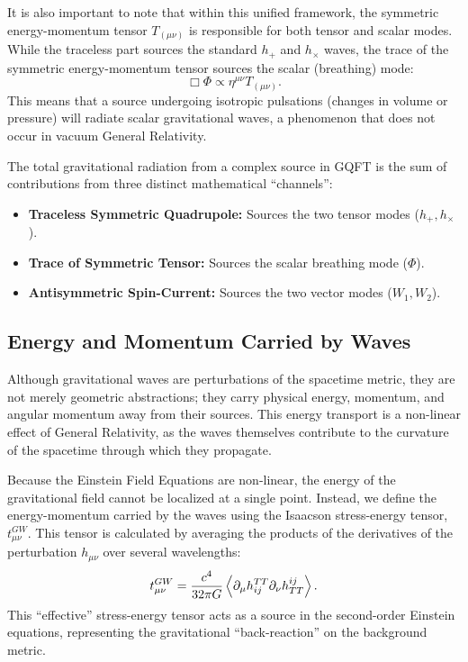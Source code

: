 It is also important to note that within this unified framework, the symmetric energy-momentum tensor $T_{(\mu\nu)}$ is responsible for both tensor and scalar modes. While the traceless part sources the standard $h_+$ and $h_\times$ waves, the trace of the symmetric energy-momentum tensor sources the scalar (breathing) mode:
\[%
  \Box \Phi \propto \eta^{\mu\nu} T_{(\mu\nu)}
.\]%
This means that a source undergoing isotropic pulsations (changes in volume or pressure) will radiate scalar gravitational waves, a phenomenon that does not occur in vacuum General Relativity.

The total gravitational radiation from a complex source in GQFT is the sum of contributions from three distinct mathematical ``channels'':
\begin{itemize}
  \item \textbf{Traceless Symmetric Quadrupole:} Sources the two tensor modes ($h_+, h_\times$).
  \item \textbf{Trace of Symmetric Tensor:} Sources the scalar breathing mode ($\Phi$).
  \item \textbf{Antisymmetric Spin-Current:} Sources the two vector modes ($W_1, W_2$).
\end{itemize}

\subsection{Energy and Momentum Carried by Waves} Although gravitational waves are perturbations of the spacetime metric, they are not merely geometric abstractions; they carry physical energy, momentum, and angular momentum away from their sources. This energy transport is a non-linear effect of General Relativity, as the waves themselves contribute to the curvature of the spacetime through which they propagate.

Because the Einstein Field Equations are non-linear, the energy of the gravitational field cannot be localized at a single point. Instead, we define the energy-momentum carried by the waves using the Isaacson stress-energy tensor, $t_{\mu\nu}^{GW}$. This tensor is calculated by averaging the products of the derivatives of the perturbation $h_{\mu\nu}$ over several wavelengths:
\[%
  t_{\mu\nu}^{GW} = \frac{c^4}{32\pi G} \braket{\partial_\mu h_{ij}^{TT} \partial_\nu h^{ij}_{TT}}
.\]%
This ``effective'' stress-energy tensor acts as a source in the second-order Einstein equations, representing the gravitational ``back-reaction'' on the background metric.


